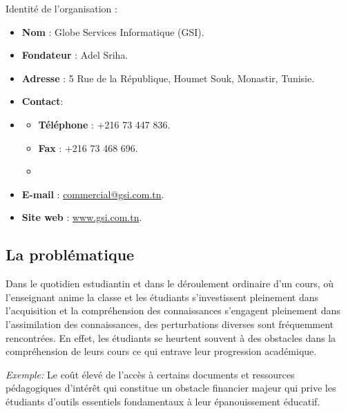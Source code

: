 Identité de l'organisation :
\begin{itemize}[itemsep=2pt, parsep=2pt]
    \item \textbf{Nom} : Globe Services Informatique (GSI).
    \item \textbf{Fondateur} : Adel Sriha.
    \item \textbf{Adresse} : 5 Rue de la République, Houmet Souk, Monastir, Tunisie.
    \item \textbf{Contact}: 
    \item \begin{itemize}[itemsep=2pt, parsep=2pt]
        \item \textbf{Téléphone} : +216 73 447 836.
        \item \textbf{Fax} : +216 73 468 696.
    \item \end{itemize}
    \item \textbf{E-mail} : \href{mailto:commercial@gsi.com.tn}{commercial@gsi.com.tn}.
    \item \textbf{Site web} : \href{https://www.gsi.com.tn/}{www.gsi.com.tn}.
\end{itemize}

\subsection{La problématique}
Dans le quotidien estudiantin et dans le déroulement ordinaire d'un cours, où l'enseignant anime la classe et les étudiants s'investissent pleinement dans l'acquisition et la compréhension des connaissances s'engagent pleinement dans l'assimilation des connaissances, des perturbations diverses sont fréquemment rencontrées. En effet, les étudiants se heurtent souvent à des obstacles dans la compréhension de leurs cours ce qui entrave leur progression académique.

\vspace{0.5em}

\vspace{0.5em}
\noindent \textit{Exemple:} Le coût élevé de l’accès à certains documents et ressources pédagogiques d’intérêt qui constitue un obstacle financier majeur qui prive les étudiants d’outils essentiels fondamentaux à leur épanouissement éducatif.

